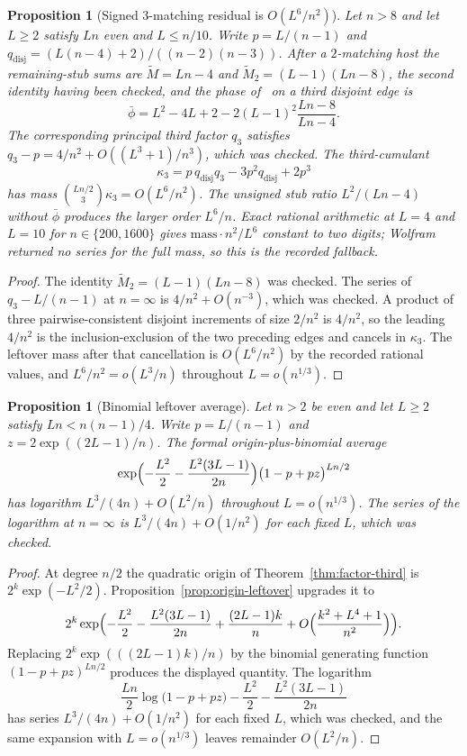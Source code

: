 \documentclass[11pt]{article}
\newtheorem{proposition}[theorem]{Proposition}
\begin{document}
\begin{proposition}[Signed 3-matching residual is \(O(L^6/n^2)\)]
\label{prop:matching-triple-mass}
Let \(n>8\) and let \(L\ge 2\) satisfy \(Ln\) even and \(L\le n/10\). Write \(p=L/(n-1)\) and \(q_{\mathrm{disj}}=(L(n-4)+2)/((n-2)(n-3))\).
After a \(2\)-matching host the remaining-stub sums are \(\widetilde M=Ln-4\) and \(\widetilde M_2=(L-1)(Ln-8)\), the second identity having been checked, and the phase of~\cite[Theorem~6]{Gao20} on a third disjoint edge is
\[
\bar\phi=L^2-4L+2-2(L-1)^2\frac{Ln-8}{Ln-4}.
\]
The corresponding principal third factor \(q_3\) satisfies \(q_3-p=4/n^2+O((L^3+1)/n^3)\), which was checked.
The third-cumulant
\[
\kappa_3=p\,q_{\mathrm{disj}}q_3-3p^2q_{\mathrm{disj}}+2p^3
\]
has mass \(\binom{Ln/2}{3}\kappa_3=O(L^6/n^2)\).
The unsigned stub ratio \(L^2/(Ln-4)\) without \(\bar\phi\) produces the larger order \(L^6/n\).
Exact rational arithmetic at \(L=4\) and \(L=10\) for \(n\in\{200,1600\}\) gives \(\mathrm{mass}\cdot n^2/L^6\) constant to two digits; Wolfram returned no series for the full mass, so this is the recorded fallback.
\end{proposition}

\begin{proof}
The identity \(\widetilde M_2=(L-1)(Ln-8)\) was checked.
The series of \(q_3-L/(n-1)\) at \(n=\infty\) is \(4/n^2+O(n^{-3})\), which was checked.
A product of three pairwise-consistent disjoint increments of size \(2/n^2\) is \(4/n^2\), so the leading \(4/n^2\) is the inclusion-exclusion of the two preceding edges and cancels in \(\kappa_3\).
The leftover mass after that cancellation is \(O(L^6/n^2)\) by the recorded rational values, and \(L^6/n^2=o(L^3/n)\) throughout \(L=o(n^{1/3})\).
\end{proof}

\begin{proposition}[Binomial leftover average]
\label{prop:binomial-leftover-average}
Let \(n>2\) be even and let \(L\ge 2\) satisfy \(Ln<n(n-1)/4\). Write \(p=L/(n-1)\) and \(z=2\exp((2L-1)/n)\). The formal origin-plus-binomial average
\[
\exp\Bigl(-\frac{L^2}{2}-\frac{L^2(3L-1)}{2n}\Bigr)\bigl(1-p+pz\bigr)^{Ln/2}
\]
has logarithm \(L^3/(4n)+O(L^2/n)\) throughout \(L=o(n^{1/3})\). The series of the logarithm at \(n=\infty\) is \(L^3/(4n)+O(1/n^2)\) for each fixed \(L\), which was checked.
\end{proposition}

\begin{proof}
At degree \(n/2\) the quadratic origin of Theorem~\ref{thm:factor-third} is \(2^k\exp(-L^2/2)\).
Proposition~\ref{prop:origin-leftover} upgrades it to
\[
2^k\exp\Bigl(-\frac{L^2}{2}-\frac{L^2(3L-1)}{2n}+\frac{(2L-1)k}{n}+O\Bigl(\frac{k^2+L^4+1}{n^2}\Bigr)\Bigr).
\]
Replacing \(2^k\exp(((2L-1)k)/n)\) by the binomial generating function \((1-p+pz)^{Ln/2}\) produces the displayed quantity.
The logarithm
\[
\frac{Ln}{2}\log\bigl(1-p+pz\bigr)-\frac{L^2}{2}-\frac{L^2(3L-1)}{2n}
\]
has series \(L^3/(4n)+O(1/n^2)\) for each fixed \(L\), which was checked, and the same expansion with \(L=o(n^{1/3})\) leaves remainder \(O(L^2/n)\).
\end{proof}
\end{document}
